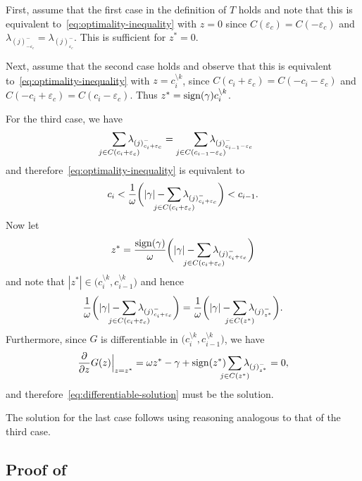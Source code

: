 First, assume that the first case in the definition of \(T\) holds
and note that this is equivalent to~\eqref{eq:optimality-inequality} with \(z
= 0\) since \(C({\varepsilon_c}) = C(-{\varepsilon_c})\) and
\(\lambda_{(j)^-_{-{\varepsilon_c}}} = \lambda_{(j)^-_{{\varepsilon_c}}}\).
This is sufficient for \(z^* = 0\).

Next, assume that the second case holds and observe that this is equivalent
to~\eqref{eq:optimality-inequality} with
\(z = c_i^{\setminus k}\), since
\(C(c_i + {\varepsilon_c}) = C(-c_i - {\varepsilon_c})\) and
\(C(-c_i + {\varepsilon_c}) = C(c_i - {\varepsilon_c})\). Thus \(z^* =
\operatorname{sign}(\gamma)c_i^{\setminus k}\).

For the third case, we have
\[
	\smashoperator{\sum_{j \in C(c_i + {\varepsilon_c})}} \lambda_{(j)^-_{c_i + {\varepsilon_c}}}
	=
	\smashoperator[r]{\sum_{j \in C(c_{i-1} - {\varepsilon_c})}} \lambda_{(j)^-_{c_{i-1} - {\varepsilon_c}}}
\]
and therefore~\eqref{eq:optimality-inequality} is equivalent to
\[
	c_i < \frac{1}{\omega} \bigg( |\gamma| - \smashoperator{\sum_{j \in C(c_i + {\varepsilon_c})}} \lambda_{(j)^-_{c_i + {\varepsilon_c}}} \bigg) < c_{i -1}.
\]
Now let
\begin{equation}
	\label{eq:differentiable-solution}
	z^* = \frac{\sign(\gamma)}{\omega} \bigg( |\gamma| - \smashoperator{\sum_{j \in C(c_i + {\varepsilon_c})}} \lambda_{(j)^-_{c_i + {\varepsilon_c}}} \bigg)
\end{equation}
and note that \(|z^*| \in \big(c_i^{\setminus k}, c_{i-1}^{\setminus k}\big)\) and hence
\[
	\frac{1}{\omega} \bigg( |\gamma| - \smashoperator{\sum_{j \in C(c_i + {\varepsilon_c})}} \lambda_{(j)^-_{c_i + {\varepsilon_c}}} \bigg)
	=
	\frac{1}{\omega} \bigg( |\gamma| - \smashoperator{\sum_{j \in C(z^*)}} \lambda_{(j)^-_{z^*}} \bigg).
\]
Furthermore, since \(G\) is differentiable in \(\big(c_i^{\setminus k}, c_{i-1}^{\setminus k}\big)\), we have
\[
	\frac{\partial}{\partial z} G(z) \Big|_{z = z^*}
	= \omega z^* - \gamma + \sign(z^*) \smashoperator{\sum_{j \in C(z^*)}} \lambda_{(j)^-_{z^*}} = 0,
\]
and therefore~\eqref{eq:differentiable-solution} must be the solution.

The solution for the last case follows using reasoning analogous to that of the
third case.

\subsection{Proof of }


